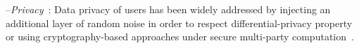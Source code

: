 \documentclass[twoside]{article}
\begin{document}
 --\emph{Privacy}~\cite{geyer2017differentially,hardy2017private}: Data privacy of users has been widely addressed by injecting an additional layer of random noise in order to respect differential-privacy property~\cite{mcmahan2017learning} or using cryptography-based approaches under secure multi-party computation~\cite{bonawitz2017practical}.
\end{document}
